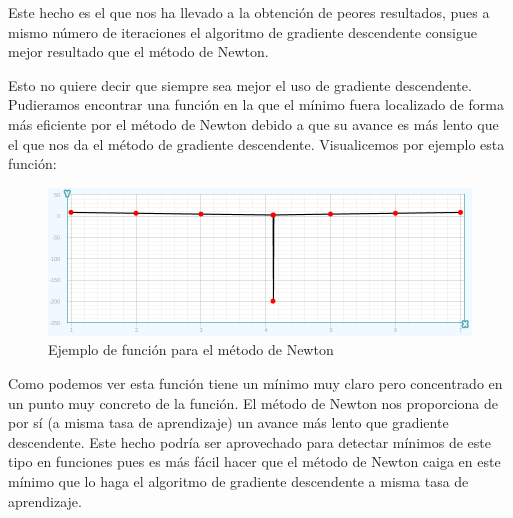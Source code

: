 \documentclass[12pt,a4paper]{article}
\begin{document}
Este hecho es el que nos ha llevado a la obtención de peores resultados, pues a mismo número de iteraciones el algoritmo de gradiente descendente consigue mejor resultado que el método de Newton.

Esto no quiere decir que siempre sea mejor el uso de gradiente descendente. Pudieramos encontrar una función en la que el mínimo fuera localizado de forma más eficiente por el método de Newton debido a que su avance es más lento que el que nos da el método de gradiente descendente. Visualicemos por ejemplo esta función:

\begin{figure}[H]
	\centering
	\includegraphics[scale=0.5]{./Imagenes/bonus5.png}
	\caption{Ejemplo de función para el método de Newton}
	\label{bonus5}
\end{figure}

Como podemos ver esta función tiene un mínimo muy claro pero concentrado en un punto muy concreto de la función. El método de Newton nos proporciona de por sí (a misma tasa de aprendizaje) un avance más lento que gradiente descendente. Este hecho podría ser aprovechado para detectar mínimos de este tipo en funciones pues es más fácil hacer que el método de Newton caiga en este mínimo que lo haga el algoritmo de gradiente descendente a misma tasa de aprendizaje.
\end{document}
